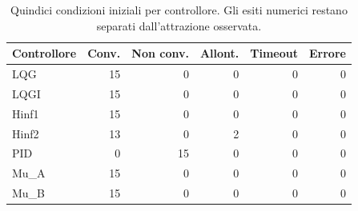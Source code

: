 \begin{table}[htbp]\centering\small
\setlength{\tabcolsep}{4pt}
\begin{tabular}{lrrrrr}\toprule
Controllore & Conv. & Non conv. & Allont. & Timeout & Errore\\\midrule
LQG & 15 & 0 & 0 & 0 & 0\\
LQGI & 15 & 0 & 0 & 0 & 0\\
Hinf1 & 15 & 0 & 0 & 0 & 0\\
Hinf2 & 13 & 0 & 2 & 0 & 0\\
PID & 0 & 15 & 0 & 0 & 0\\
Mu\_A & 15 & 0 & 0 & 0 & 0\\
Mu\_B & 15 & 0 & 0 & 0 & 0\\
\bottomrule\end{tabular}
\caption{Quindici condizioni iniziali per controllore. Gli esiti numerici restano separati dall'attrazione osservata.}
\end{table}
